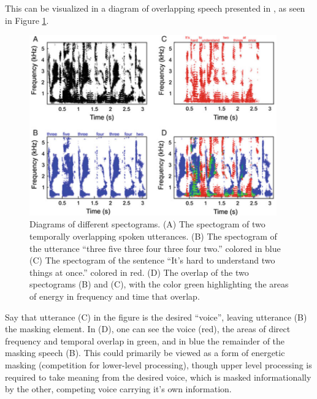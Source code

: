 \documentclass[dissertation,copyright]{uathesis}
\begin{document}
This can be visualized in a diagram of overlapping speech presented in \cite{middlebrooks:17}, as seen in Figure \ref{fig:sos-masked-spctgrms}.
%
\begin{figure}
\centering
  \includegraphics[width=0.95\textwidth]{figure/speech-on-speech_masked_spectrograms.png}
  \caption{Diagrams of different spectograms. (A) The spectogram of two temporally overlapping spoken utterances. (B) The spectogram of the utterance ``three five three four three four two.'' colored in blue (C) The spectogram of the sentence ``It's hard to understand two things at once.'' colored in red. (D) The overlap of the two spectograms (B) and (C), with the color green highlighting the areas of energy in frequency and time that overlap. }
  \label{fig:sos-masked-spctgrms}
\end{figure}
%
Say that utterance (C) in the figure is the desired ``voice'', leaving utterance (B) the masking element.  In (D), one can see the voice (red), the areas of direct frequency and temporal overlap in green, and in blue the remainder of the masking speech (B). This could primarily be viewed as a form of energetic masking (competition for lower-level processing), though upper level processing is required to take meaning from the desired voice, which is masked informationally by the other, competing voice carrying it's own information.
\end{document}
